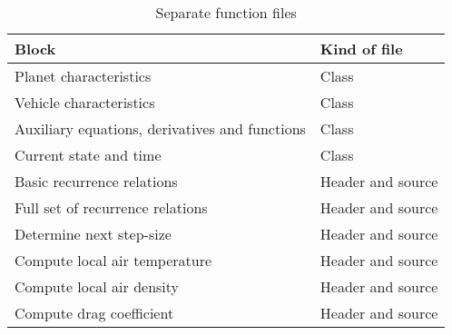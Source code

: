 \begin{table}[H]
\begin{center}
\caption{Separate function files}
\label{tab:classes}
\begin{tabular}{|l|l|}
\hline 
\textbf{Block} & \textbf{Kind of file}  \\ \hline 
Planet characteristics & Class \\ \hline
Vehicle characteristics & Class \\ \hline
Auxiliary equations, derivatives and functions & Class \\ \hline
Current state and time & Class \\ \hline
Basic recurrence relations & Header and source \\ \hline
Full set of recurrence relations & Header and source \\ \hline
Determine next step-size & Header and source \\ \hline
Compute local air temperature & Header and source \\ \hline
Compute local air density & Header and source \\ \hline
Compute drag coefficient & Header and source \\ \hline
\end{tabular}
\end{center}
\end{table}


